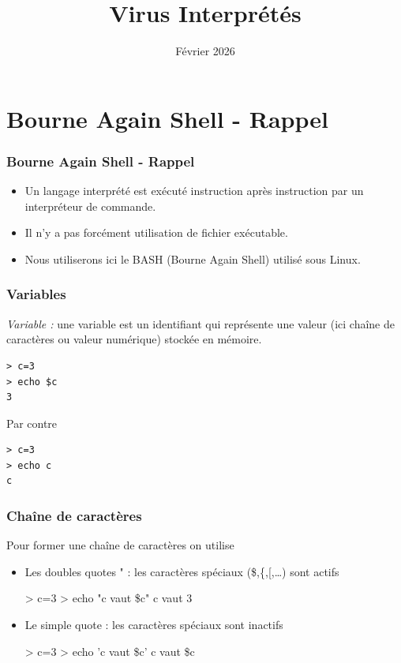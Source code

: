 \documentclass{beamer}
\title{Virus Interprétés}
\date{Février 2026}
\newenvironment{terminal}{\color{white}\begin{snugshade*}}
{\end{snugshade*}\color{black}}
\newcommand{\enlight}[1]{\textit{\color{blue}#1}}
\begin{document}
\maketitle


\section{Bourne Again Shell - Rappel}

\begin{frame}
\frametitle{Bourne Again Shell - Rappel}


\begin{itemize}
\item Un langage interprété est exécuté instruction après instruction par un interpréteur de commande.
\item Il n'y a pas forcément utilisation de fichier exécutable.
\item Nous utiliserons ici le BASH (Bourne Again Shell) utilisé sous Linux.
\end{itemize}
\end{frame}



\begin{frame}[fragile]
\frametitle{Variables}
\enlight{Variable :} une variable est un identifiant qui représente une valeur (ici chaîne de caractères ou valeur numérique) stockée en mémoire.
\begin{terminal}
\begin{verbatim}
> c=3
> echo $c
3
\end{verbatim}
\end{terminal}
Par contre
\begin{terminal}
\begin{verbatim}
> c=3
> echo c
c
\end{verbatim}
\end{terminal}
\end{frame}

\begin{frame}[fragile]
\frametitle{Chaîne de caractères}

Pour former une chaîne de caractères on utilise
\begin{itemize}
\item Les doubles quotes " : les caractères spéciaux (\$,\{,[,\ldots) sont actifs
  \begin{terminal}
\begin{semiverbatim}
> c=3
> echo "c vaut \$c"
c vaut 3
\end{semiverbatim}
\end{terminal}
\item Le simple quote : les caractères spéciaux sont inactifs
\begin{terminal}
\begin{semiverbatim}
> c=3
> echo 'c vaut \$c'
c vaut \$c
\end{semiverbatim}
\end{terminal}
\end{itemize}
\end{frame}
\end{document}
